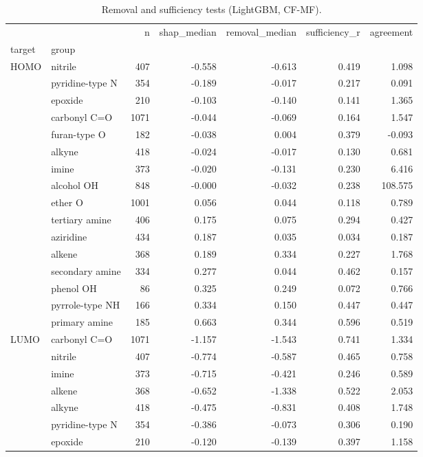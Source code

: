 \begin{table}
\caption{Removal and sufficiency tests (LightGBM, CF-MF).}
\label{tab:validation}
\begin{tabular}{llrrrrr}
\toprule
 &  & n & shap\_median & removal\_median & sufficiency\_r & agreement \\
target & group &  &  &  &  &  \\
\midrule
\multirow[t]{16}{*}{HOMO} & nitrile & 407 & -0.558 & -0.613 & 0.419 & 1.098 \\
 & pyridine-type N & 354 & -0.189 & -0.017 & 0.217 & 0.091 \\
 & epoxide & 210 & -0.103 & -0.140 & 0.141 & 1.365 \\
 & carbonyl C=O & 1071 & -0.044 & -0.069 & 0.164 & 1.547 \\
 & furan-type O & 182 & -0.038 & 0.004 & 0.379 & -0.093 \\
 & alkyne & 418 & -0.024 & -0.017 & 0.130 & 0.681 \\
 & imine & 373 & -0.020 & -0.131 & 0.230 & 6.416 \\
 & alcohol OH & 848 & -0.000 & -0.032 & 0.238 & 108.575 \\
 & ether O & 1001 & 0.056 & 0.044 & 0.118 & 0.789 \\
 & tertiary amine & 406 & 0.175 & 0.075 & 0.294 & 0.427 \\
 & aziridine & 434 & 0.187 & 0.035 & 0.034 & 0.187 \\
 & alkene & 368 & 0.189 & 0.334 & 0.227 & 1.768 \\
 & secondary amine & 334 & 0.277 & 0.044 & 0.462 & 0.157 \\
 & phenol OH & 86 & 0.325 & 0.249 & 0.072 & 0.766 \\
 & pyrrole-type NH & 166 & 0.334 & 0.150 & 0.447 & 0.447 \\
 & primary amine & 185 & 0.663 & 0.344 & 0.596 & 0.519 \\
\cline{1-7}
\multirow[t]{16}{*}{LUMO} & carbonyl C=O & 1071 & -1.157 & -1.543 & 0.741 & 1.334 \\
 & nitrile & 407 & -0.774 & -0.587 & 0.465 & 0.758 \\
 & imine & 373 & -0.715 & -0.421 & 0.246 & 0.589 \\
 & alkene & 368 & -0.652 & -1.338 & 0.522 & 2.053 \\
 & alkyne & 418 & -0.475 & -0.831 & 0.408 & 1.748 \\
 & pyridine-type N & 354 & -0.386 & -0.073 & 0.306 & 0.190 \\
 & epoxide & 210 & -0.120 & -0.139 & 0.397 & 1.158 \\

\end{tabular}
\end{table}
